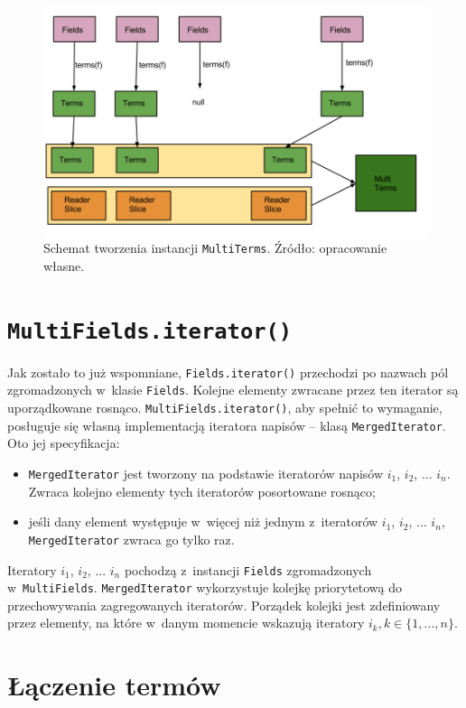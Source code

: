 \begin{figure}[here]
 \centering
 \includegraphics[scale=0.4]{pictures/MultiTerms.png}
 \caption{Schemat tworzenia instancji \texttt{MultiTerms}. Źródło: opracowanie własne. \label{fig:multiTerms}}
\end{figure}

\section{\texttt{MultiFields.iterator()}}

Jak zostało to już wspomniane, \texttt{Fields.iterator()} przechodzi po nazwach pól zgromadzonych w~klasie \texttt{Fields}. Kolejne elementy zwracane przez ten iterator są uporządkowane rosnąco. \texttt{MultiFields.iterator()}, aby spełnić to wymaganie, posługuje się własną implementacją iteratora napisów -- klasą \texttt{MergedIterator}. Oto jej specyfikacja:
\begin{itemize}
 \item \texttt{MergedIterator} jest tworzony na podstawie iteratorów napisów $i_1$, $i_2$, ... $i_n$. Zwraca kolejno elementy tych iteratorów posortowane rosnąco; 
 \item jeśli dany element występuje w~więcej niż jednym z~iteratorów $i_1$, $i_2$, ... $i_n$, \texttt{MergedIterator} zwraca go tylko raz.
\end{itemize}
Iteratory $i_1$, $i_2$, ... $i_n$ pochodzą z~instancji \texttt{Fields} zgromadzonych w~\texttt{MultiFields}. \texttt{MergedIterator} wykorzystuje kolejkę priorytetową do przechowywania zagregowanych iteratorów. Porządek kolejki jest zdefiniowany przez elementy, na które w~danym momencie wskazują iteratory $i_k, k \in \{1, ..., n\}$.

\section{Łączenie termów}
\label{sec:termsMerge}

